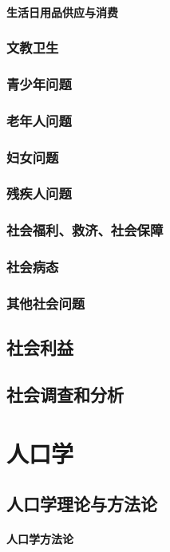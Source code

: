 \documentclass[UTF8]{../RepresentationUniverse}
\begin{document}
        \subsubsection{生活日用品供应与消费}
    \subsection{文教卫生}
    \subsection{青少年问题}
    \subsection{老年人问题}
    \subsection{妇女问题}
    \subsection{残疾人问题}
    \subsection{社会福利、救济、社会保障}
    \subsection{社会病态}
    \subsection{其他社会问题}
\section{社会利益}
\section{社会调查和分析}




\chapter{人口学}
\section{人口学理论与方法论}
    \subsubsection{人口学方法论}
\end{document}

